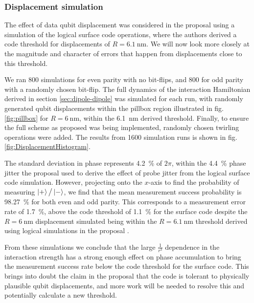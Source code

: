 
\subsubsection{Displacement simulation}\label{sec:DisplacementSimulation}
The effect of data qubit displacement was considered in the proposal \cite{OGorman2016} using a simulation of the logical surface code operations, where the authors derived a code threshold for displacements of $R=\SI{6.1}{\nano\metre}$. We will now look more closely at the magnitude and character of errors that happen from displacements close to this threshold. 

We ran 800 simulations for even parity with no bit-flips, and 800 for odd parity with a randomly chosen bit-flip. The full dynamics of the interaction Hamiltonian derived in section \ref{sec:dipole-dipole} was simulated for each run, with randomly generated qubit displacements within the pillbox region illustrated in fig.\@ \ref{fig:pillbox} for $R = \SI{6}{\nano\metre}$, within the \SI{6.1}{\nano\metre} derived threshold. Finally, to ensure the full scheme as proposed was being implemented, randomly chosen twirling operations were added. The results from 1600 simulation runs is shown in fig.\@ \ref{fig:DisplacementHistogram}.


The standard deviation in phase represents \SI{4.2}{\percent} of $2\pi$, within the \SI{4.4}{\percent} phase jitter the proposal \cite{OGorman2016} used to derive the effect of probe jitter from the logical surface code simulation. However, projecting onto the $x$-axis to find the probability of measuring $\ket{+}\big/\ket{-}$, we find that the mean measurement success probability is \SI{98.27}{\percent} for both even and odd parity. This corresponds to a measurement error rate of \SI{1.7}{\percent}, above the code threshold of \SI{1.1}{\percent} for the surface code \cite{Wang2011,Fowler2012} despite the $R = \SI{6}{\nano\metre}$ displacement simulated being within the $R=\SI{6.1}{\nano\metre}$ threshold derived using logical simulations in the proposal \cite{OGorman2016}. 

From these simulations we conclude that the large $\tfrac{1}{r^3}$ dependence in the interaction strength has a strong enough effect on phase accumulation to bring the measurement success rate below the code threshold for the surface code. This brings into doubt the claim in the proposal \cite{OGorman2016} that the code is tolerant to physically plausible qubit displacements, and more work will be needed to resolve this and potentially calculate a new threshold.

